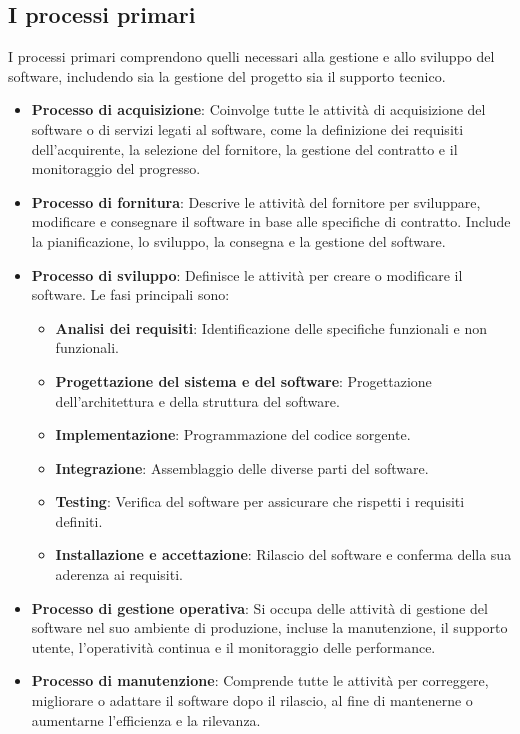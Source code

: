 \subsection{I processi primari}
I processi primari comprendono quelli necessari alla gestione e allo sviluppo del software, includendo sia la gestione del progetto sia il supporto tecnico.
\begin{itemize}
    \item \textbf{Processo di acquisizione}: Coinvolge tutte le attività di acquisizione del software o di servizi legati al software, come la definizione dei requisiti dell'acquirente, la selezione del fornitore, la gestione del contratto e il monitoraggio del progresso.
    \item \textbf{Processo di fornitura}: Descrive le attività del fornitore per sviluppare, modificare e consegnare il software in base alle specifiche di contratto. Include la pianificazione, lo sviluppo, la consegna e la gestione del software.
    \item \textbf{Processo di sviluppo}: Definisce le attività per creare o modificare il software. Le fasi principali sono:
    \begin{itemize}
        \item \textbf{Analisi dei requisiti}: Identificazione delle specifiche funzionali e non funzionali.
        \item \textbf{Progettazione del sistema e del software}: Progettazione dell'architettura e della struttura del software.
        \item \textbf{Implementazione}: Programmazione del codice sorgente.
        \item \textbf{Integrazione}: Assemblaggio delle diverse parti del software.
        \item \textbf{Testing}: Verifica del software per assicurare che rispetti i requisiti definiti.
        \item \textbf{Installazione e accettazione}: Rilascio del software e conferma della sua aderenza ai requisiti.
    \end{itemize}
    \item \textbf{Processo di gestione operativa}: Si occupa delle attività di gestione del software nel suo ambiente di produzione, incluse la manutenzione, il supporto utente, l'operatività continua e il monitoraggio delle performance.
    \item \textbf{Processo di manutenzione}: Comprende tutte le attività per correggere, migliorare o adattare il software dopo il rilascio, al fine di mantenerne o aumentarne l'efficienza e la rilevanza.
\end{itemize}


